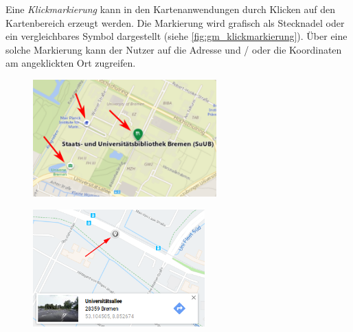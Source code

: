 Eine \emph{Klickmarkierung} kann in den Kartenanwendungen durch Klicken auf den Kartenbereich erzeugt werden.
Die Markierung wird grafisch als Stecknadel oder ein vergleichbares Symbol dargestellt (siehe \autoref{fig:gm_klickmarkierung}).
Über eine solche Markierung kann der Nutzer auf die Adresse und / oder die Koordinaten am angeklickten Ort zugreifen.
\begin{figure}[t]
    \centering
    \begin{minipage}[t]{.485\textwidth}
        \centering
        \vspace{0pt}
        \includegraphics[width=\linewidth, height=4.5cm]{figures/map-app_examples/bm_gebaeudemarkierungen_arrows}
        \label{fig:bm_gebaeudemarkierungen}
        \vfill
    \end{minipage}
    \hfill
    \begin{minipage}[t]{.485\textwidth}
        \centering
        \vspace{0pt}
        \includegraphics[width=\linewidth, height=4.5cm]{figures/map-app_examples/gm_klickmarkierung}
        \label{fig:gm_klickmarkierung}
    \end{minipage}
\end{figure}

